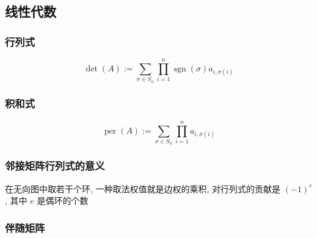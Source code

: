 \subsection{线性代数}
\label{ssec:lalg}

\subsubsection{行列式}

\begin{equation}
    \operatorname{det}(A):=\sum_{\sigma\in S_n}\prod_{i=1}^n \operatorname{sgn}(\sigma) a_{i,\sigma(i)}
\end{equation}

\subsubsection{积和式}

\begin{equation}
    \operatorname{per}(A):=\sum_{\sigma\in S_n}\prod_{i=1}^n a_{i,\sigma(i)}
\end{equation}

\subsubsection{邻接矩阵行列式的意义}

在无向图中取若干个环, 一种取法权值就是边权的乘积, 对行列式的贡献是 \((-1)^{e}\), 其中 \(e\) 是偶环的个数

\subsubsection{伴随矩阵}
\label{sssec:adjmat}

